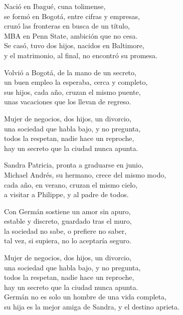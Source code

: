 \begin{lyrics}
Nació en Ibagué, cuna tolimense,\\
se formó en Bogotá, entre cifras y empresas,\\
cruzó las fronteras en busca de un título,\\
MBA en Penn State, ambición que no cesa.\\
Se casó, tuvo dos hijos, nacidos en Baltimore,\\
y el matrimonio, al final, no encontró su promesa.

Volvió a Bogotá, de la mano de un secreto,\\
un buen empleo la esperaba, cerca y completo,\\
sus hijos, cada año, cruzan el mismo puente,\\
unas vacaciones que los llevan de regreso.

Mujer de negocios, dos hijos, un divorcio,\\
una sociedad que habla bajo, y no pregunta,\\
todos la respetan, nadie hace un reproche,\\
hay un secreto que la ciudad nunca apunta.

Sandra Patricia, pronta a graduarse en junio,\\
Michael Andrés, su hermano, crece del mismo modo,\\
cada año, en verano, cruzan el mismo cielo,\\
a visitar a Philippe, y al padre de todos.

Con Germán sostiene un amor sin apuro,\\
estable y discreto, guardado tras el muro,\\
la sociedad no sabe, o prefiere no saber,\\
tal vez, si supiera, no lo aceptaría seguro.

Mujer de negocios, dos hijos, un divorcio,\\
una sociedad que habla bajo, y no pregunta,\\
todos la respetan, nadie hace un reproche,\\
hay un secreto que la ciudad nunca apunta.\\
Germán no es solo un hombre de una vida completa,\\
su hija es la mejor amiga de Sandra, y el destino aprieta.
\end{lyrics}

